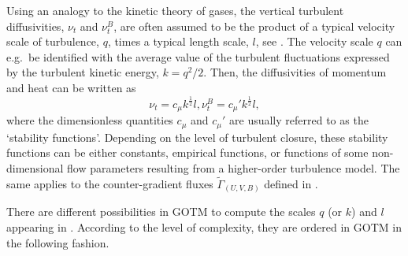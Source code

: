 Using an analogy to the kinetic theory of gases, the vertical
turbulent diffusivities, $\nu_t$ and $\nu^B_t$, are often assumed to be the
product of a typical velocity scale of turbulence, $q$, times a
typical length scale, $l$, see \cite{TennekesLumley72}. The velocity
scale $q$ can e.g.\ be identified with the average value of the
turbulent fluctuations expressed by the turbulent kinetic energy, $k=
q^2 /2$.  Then, the diffusivities of momentum and heat can be written
as
\begin{equation}
  \label{nu}
  \nu_t = c_\mu k^\frac{1}{2} l  \comma   \nu^B_t = c_\mu' k^\frac{1}{2} l  
  \comma
\end{equation}
where the dimensionless quantities $c_\mu$ and ${c_\mu}'$ are usually
referred to as the `stability functions'.  Depending on the level of
turbulent closure, these stability functions can be either constants, 
empirical functions, or functions of some non-dimensional flow parameters
resulting from a higher-order turbulence model. The same applies to
the counter-gradient fluxes $\tilde{\Gamma}_{(U,V,B)}$ defined in .

There are different possibilities in GOTM to compute the scales $q$ (or
$k$) and $l$ appearing in . According to the level of
complexity, they are ordered in GOTM in the following fashion.

